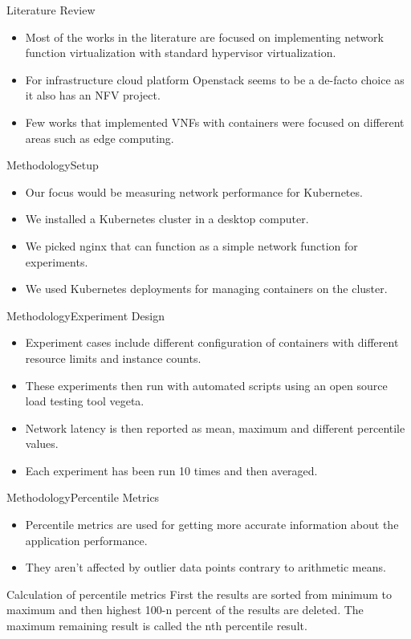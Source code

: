 \documentclass{beamer}
\begin{document}
\begin{frame}{Literature Review}
 \begin{itemize}
  \item Most of the works in the literature are focused on implementing network function virtualization with
  standard hypervisor virtualization.
  \item For infrastructure cloud platform Openstack seems to be a de-facto choice as it also has an NFV project.
  \item Few works that implemented VNFs with containers were focused on different areas such as edge computing.
 \end{itemize}

\end{frame}


\begin{frame}{Methodology}{Setup}
 \begin{itemize}
  \item Our focus would be measuring network performance for Kubernetes.
  \item We installed a Kubernetes cluster in a desktop computer.
  \item We picked nginx that can function as a simple network function for experiments.
  \item We used Kubernetes deployments for managing containers on the cluster.
 \end{itemize}
\end{frame}

\begin{frame}{Methodology}{Experiment Design}
 \begin{itemize}
  \item Experiment cases include different configuration of containers with different
  resource limits and instance counts.
  \item These experiments then run with automated scripts using an open source load testing tool vegeta.
  \item Network latency is then reported as mean, maximum and different percentile values.
  \item Each experiment has been run 10 times and then averaged.
 \end{itemize}
\end{frame}

\begin{frame}{Methodology}{Percentile Metrics}
 \begin{itemize}
  \item Percentile metrics are used for getting more accurate information about the application performance.
  \item They aren't affected by outlier data points contrary to arithmetic means.
 \end{itemize}
 \begin{block}{Calculation of percentile metrics}
  First the results are sorted from minimum to maximum and then highest 100-n percent of the results are deleted.
  The maximum remaining result is called the nth percentile result.
 \end{block}
\end{frame}
\end{document}
